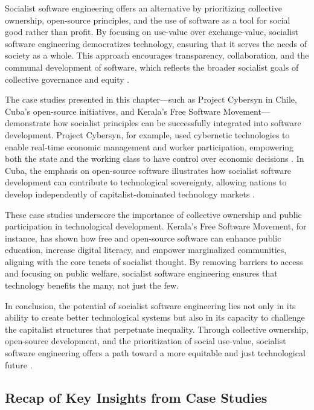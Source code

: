 \begin{refsection}
Socialist software engineering offers an alternative by prioritizing collective ownership, open-source principles, and the use of software as a tool for social good rather than profit. By focusing on use-value over exchange-value, socialist software engineering democratizes technology, ensuring that it serves the needs of society as a whole. This approach encourages transparency, collaboration, and the communal development of software, which reflects the broader socialist goals of collective governance and equity \cite[pp.~85]{stallman2010}.

The case studies presented in this chapter—such as Project Cybersyn in Chile, Cuba’s open-source initiatives, and Kerala’s Free Software Movement—demonstrate how socialist principles can be successfully integrated into software development. Project Cybersyn, for example, used cybernetic technologies to enable real-time economic management and worker participation, empowering both the state and the working class to have control over economic decisions \cite[pp.~189]{medina2014}. In Cuba, the emphasis on open-source software illustrates how socialist software development can contribute to technological sovereignty, allowing nations to develop independently of capitalist-dominated technology markets \cite[pp.~34]{feinberg2016}.

These case studies underscore the importance of collective ownership and public participation in technological development. Kerala’s Free Software Movement, for instance, has shown how free and open-source software can enhance public education, increase digital literacy, and empower marginalized communities, aligning with the core tenets of socialist thought. By removing barriers to access and focusing on public welfare, socialist software engineering ensures that technology benefits the many, not just the few.

In conclusion, the potential of socialist software engineering lies not only in its ability to create better technological systems but also in its capacity to challenge the capitalist structures that perpetuate inequality. Through collective ownership, open-source development, and the prioritization of social use-value, socialist software engineering offers a path toward a more equitable and just technological future \cite[pp.~112]{moody2002}.

\subsection{Recap of Key Insights from Case Studies}


\end{refsection}
